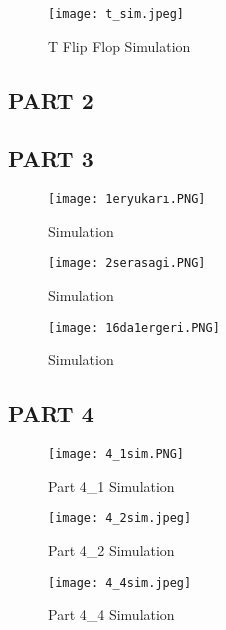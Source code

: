 \documentclass[pdftex,12pt,a4paper]{article}
\begin{document}
\begin{figure}[hbt!]
	\centering
	\texttt{[image: t\_sim.jpeg]}	
	\caption{T Flip Flop Simulation}
	\label{fig1}
\end{figure}



\clearpage

\subsection{PART 2}

\clearpage





\subsection{PART 3}

\begin{figure}[hbt!]
	\centering
	\texttt{[image: 1eryukarı.PNG]}	
	\caption{Simulation}
	\label{fig1}
\end{figure}

\begin{figure}[hbt!]
	\centering
	\texttt{[image: 2serasagi.PNG]}	
	\caption{Simulation}
	\label{fig1}
\end{figure}

\begin{figure}[hbt!]
	\centering
	\texttt{[image: 16da1ergeri.PNG]}	
	\caption{Simulation}
	\label{fig1}
\end{figure}

\clearpage



\subsection{PART 4}
\begin{figure}[hbt!]
	\centering
	\texttt{[image: 4\_1sim.PNG]}	
	\caption{Part 4\_1 Simulation}
	\label{fig1}
\end{figure}
\begin{figure}[hbt!]
	\centering
	\texttt{[image: 4\_2sim.jpeg]}	
	\caption{Part 4\_2 Simulation}
	\label{fig1}
\end{figure}
\begin{figure}[hbt!]
	\centering
	\texttt{[image: 4\_4sim.jpeg]}	
	\caption{Part 4\_4 Simulation}
	\label{fig1}
\end{figure}
\end{document}
